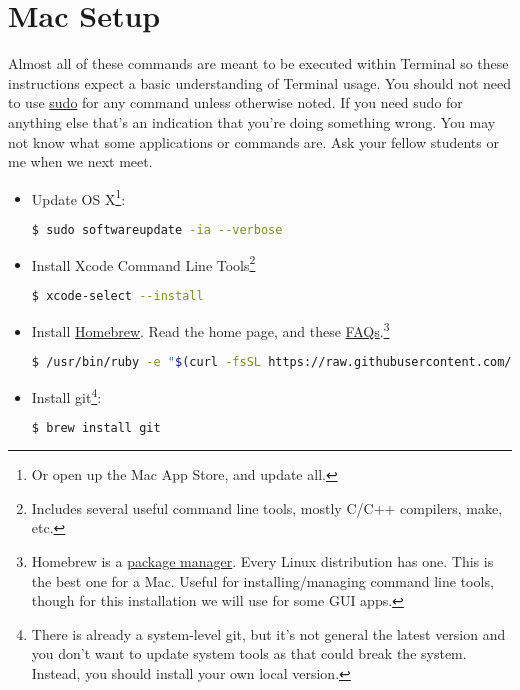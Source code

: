 
\chapter{Mac Setup}
\label{ch:macsetup}

Almost all of these commands are meant to be executed within Terminal so these instructions expect a basic understanding of Terminal usage.  You should not need to use \href{https://en.wikipedia.org/wiki/Sudo}{sudo} for any command unless otherwise noted.  If you need sudo for anything else that's an indication that you're doing something wrong.  You may not know what some applications or commands are.  Ask your fellow students or me when we next meet.

\begin{itemize}
\item Update OS X\footnote{Or open up the Mac App Store, and update all.}:
\begin{lstlisting}[language=bash]
$ sudo softwareupdate -ia --verbose
\end{lstlisting}

\item Install Xcode Command Line Tools\footnote{Includes several useful command line tools, mostly C/C++ compilers, make, etc.}
\begin{lstlisting}[language=bash]
$ xcode-select --install
\end{lstlisting}

\item Install \href{https://brew.sh}{Homebrew}.  Read the home page, and these \href{https://docs.brew.sh/FAQ}{FAQs}.\footnote{Homebrew is a \href{https://en.wikipedia.org/wiki/Package_manager}{package manager}.  Every Linux distribution has one.  This is the best one for a Mac.  Useful for installing/managing command line tools, though for this installation we will use for some GUI apps.}
\begin{lstlisting}[language=bash]
$ /usr/bin/ruby -e "$(curl -fsSL https://raw.githubusercontent.com/Homebrew/install/master/install)"   
\end{lstlisting}

\item Install git\footnote{There is already a system-level git, but it's not general the latest version and you don't want to update system tools as that could break the system.  Instead, you should install your own local version.}:
\begin{lstlisting}[language=bash]
$ brew install git
\end{lstlisting}


\end{itemize}
